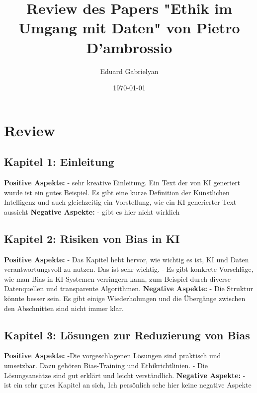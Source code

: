 \documentclass{article}
\title{Review des Papers "Ethik im Umgang mit Daten" von Pietro D'ambrossio}
\author{Eduard Gabrielyan}
\date{\today}
\begin{document}
\maketitle


\section{Review}
\subsection{Kapitel 1: Einleitung}
\textbf{Positive Aspekte:}
\newline
- sehr kreative Einleitung. Ein Text der von KI generiert wurde ist ein gutes Beispiel. Es gibt eine kurze Definition der Künstlichen Intelligenz und auch gleichzeitig ein Vorstellung, wie ein KI generierter Text aussieht
\newline
\newline
\textbf{Negative Aspekte:}
\newline
- gibt es hier nicht wirklich

\subsection{Kapitel 2: Risiken von Bias in KI}
\textbf{Positive Aspekte:}
\newline
- Das Kapitel hebt hervor, wie wichtig es ist, KI und Daten verantwortungsvoll zu nutzen. Das ist sehr wichtig.
\newline
- Es gibt konkrete Vorschläge, wie man Bias in KI-Systemen verringern kann, zum Beispiel durch diverse Datenquellen und transparente Algorithmen.
\newline
\newline
\textbf{Negative Aspekte:}
\newline
- Die Struktur könnte besser sein. Es gibt einige Wiederholungen und die Übergänge zwischen den Abschnitten sind nicht immer klar.

\subsection{Kapitel 3: Lösungen zur Reduzierung von Bias}

\textbf{Positive Aspekte:}
\newline
-Die vorgeschlagenen Lösungen sind praktisch und umsetzbar. Dazu gehören Bias-Training und Ethikrichtlinien.
\newline
- Die Lösungsansätze sind gut erklärt und leicht verständlich.
\newline
\newline
\textbf{Negative Aspekte:}
\newline
- ist ein sehr gutes Kapitel an sich, Ich persönlich sehe hier keine negative Aspekte
\end{document}
